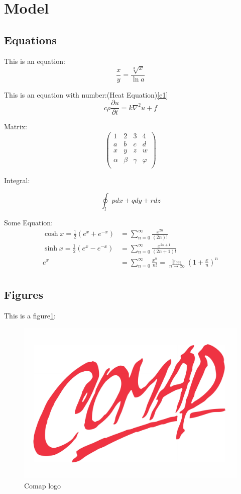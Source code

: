 \section{Model}
\lipsum[1-4] \cite{1}

\subsection{Equations}

This is an equation:$$\frac{x}{y}=\frac{\sqrt[3]{x}}{\ln a}$$

This is an equation with number:(Heat Equation)\ref{e1}
\begin{equation}\label{e1}
	c\rho\frac{\partial u}{\partial t}=k\nabla^2u+f
\end{equation}

Matrix:
$$
\left( \begin{matrix}
1&		2&		3&		4\\
a&		b&		c&		d\\
x&		y&		z&		w\\
\alpha&		\beta&		\gamma&		\varphi\\
\end{matrix} \right) 
$$

Integral:

$$
\oint_l{pdx+qdy+rdz}
$$

Some Equation:
\begin{align*}
\cosh x = \frac {1}{2} (e^x + e^{-x}) &= \sum_{n = 0}^{\infty} \frac {x^{2n}}{(2n)!} \\
\sinh x = \frac {1}{2} (e^x - e^{-x}) &= \sum_{n = 0}^{\infty} \frac {x^{2n + 1}}{(2n + 1)!} \\
e^x &= \sum_{n = 0}^{\infty} \frac {x^n}{n!} = \lim_{n\to\infty} \left (1+\frac{x}{n} \right )^n\\
\end{align*}

\subsection{Figures}
This is a figure\ref{fig:comap-logo}:
\begin{figure}[h]
	\centering
	\includegraphics[width=0.7\linewidth]{"figure/comap logo"}
	\caption{Comap logo}
	\label{fig:comap-logo}
\end{figure}
